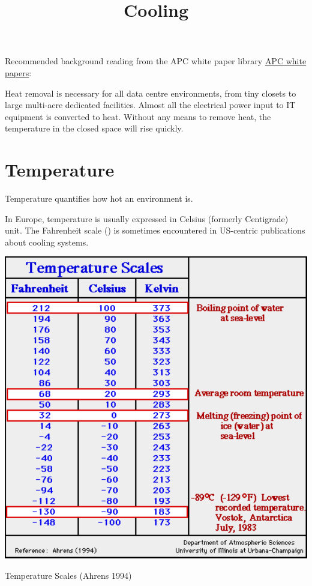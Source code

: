 \documentclass{pgnotes}
\title{Cooling}
\begin{document}
\maketitle

Recommended background reading from the APC white paper library \href{https://whitepapers.apc.com/}{APC white papers}:

Heat removal is necessary for all data centre environments, from tiny closets to large multi-acre dedicated facilities.
Almost all the electrical power input to IT equipment is converted to heat.
Without any means to remove heat, the temperature in the closed space will rise quickly.

\section{Temperature}

Temperature quantifies how hot an environment is.

In Europe, temperature is usually expressed in Celsius (formerly Centigrade) unit.
The Fahrenheit scale (\si{\fahrenheit}) is sometimes encountered in US-centric publications about cooling systems.

\begin{table}[htbp]
  \centering
  \includegraphics[width=1.0\linewidth]{temp_scales_ahrens}
  \caption{Temperature Scales (Ahrens 1994)}
  \label{tab:temp-scales}
\end{table}
\end{document}
